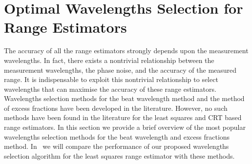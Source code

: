 


\section{Optimal Wavelengths Selection for Range Estimators}\label{ch2:wavelength-selection-methods}

The accuracy of all the range estimators strongly depends upon the measurement wavelengths. In fact, there exists a nontrivial relationship between the measurement wavelengths, the phase noise, and the accuracy of the measured range. It is indispensable to exploit this nontrivial relationship to select wavelengths that can maximise the accuracy of these range estimators. Wavelengths selection methods for the beat wavelength method and the method of excess fractions have been developed in the literature. However, no such methods have been found in the literature for the least squares and CRT based range estimators. In this section we provide a brief overview of the most popular wavelengths selection methods for the beat wavelength and excess fractions method. In~ we will compare the performance of our proposed wavelengths selection algorithm for the least squares range estimator with these methods.

